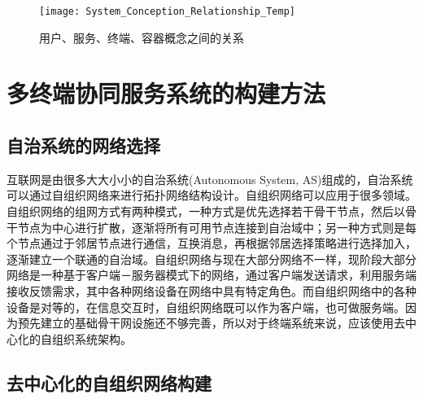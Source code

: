 \begin{figure}[!htbp]
    \centering
    \texttt{[image: System\_Conception\_Relationship\_Temp]}
    \caption{用户、服务、终端、容器概念之间的关系}
    \label{fig:system_conception_relationship}
\end{figure}


\section{多终端协同服务系统的构建方法}\label{sec:service_system_decentralized_network}
\subsection{自治系统的网络选择}

互联网是由很多大大小小的自治系统(Autonomous System, AS)组成的\cite{牛力人2015互联网关键自治系统的地理分布特性分析}，自治系统可以通过自组织网络来进行拓扑网络结构设计。自组织网络可以应用于很多领域\cite{寇明延2010面向任务能力的自组织网络体系结构}。自组织网络的组网方式有两种模式，一种方式是优先选择若干骨干节点，然后以骨干节点为中心进行扩散，逐渐将所有可用节点连接到自治域中\cite{ryu2003multitier,khan2009hierarchical}；另一种方式则是每个节点通过于邻居节点进行通信，互换消息，再根据邻居选择策略进行选择加入，逐渐建立一个联通的自治域\cite{寇明延2010面向任务能力的自组织网络体系结构}。自组织网络与现在大部分网络不一样，现阶段大部分网络是一种基于客户端－服务器模式下的网络，通过客户端发送请求，利用服务端接收反馈需求，其中各种网络设备在网络中具有特定角色。而自组织网络中的各种设备是对等的，在信息交互时，自组织网络既可以作为客户端，也可做服务端。因为预先建立的基础骨干网设施还不够完善，所以对于终端系统来说，应该使用去中心化的自组织系统架构。

\subsection{去中心化的自组织网络构建}

